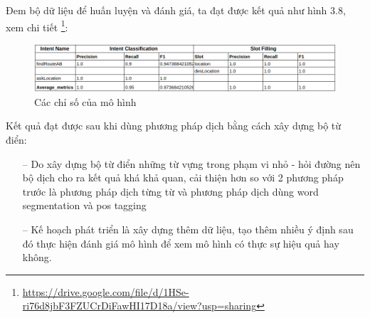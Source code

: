 Đem bộ dữ liệu để huấn luyện và đánh giá, ta đạt được kết quả như hình 3.8, xem chi tiết \footnote{\url{https://drive.google.com/file/d/1HSe-ri76d8jbF3FZUCrDiFawHI17D18a/view?usp=sharing}}:

\begin{figure}[htp]
    \centering
    \includegraphics[width=15cm]{images/metrics-tudien.png}
    \caption{Các chỉ số của mô hình}
    \label{fig:sodohethongchiduong}
\end{figure}
Kết quả đạt được sau khi dùng phương pháp dịch bằng cách xây dựng bộ từ điển:
\begin{itemize}
    \item[--] Do xây dựng bộ từ điển những từ vựng trong phạm vi nhỏ - hỏi đường nên bộ dịch cho ra kết quả khá khả quan, cải thiện hơn so với 2 phương pháp trước là phương pháp dịch từng từ và phương pháp dịch dùng word segmentation và pos tagging
    \item[--] Kế hoạch phát triển là xây dựng thêm dữ liệu, tạo thêm nhiều ý định sau đó thực hiện đánh giá mô hình để xem mô hình có thực sự hiệu quả hay không.
\end{itemize}